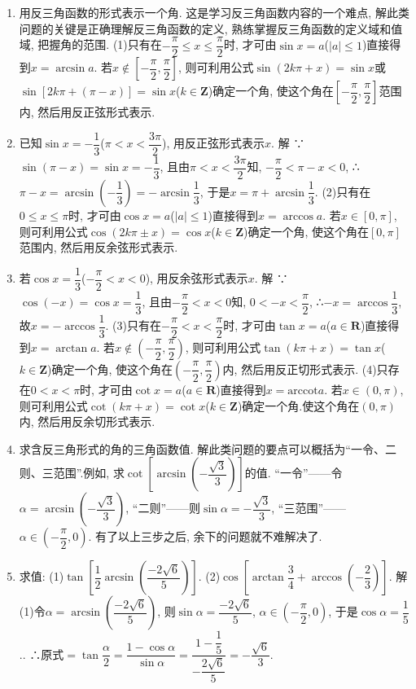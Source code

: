 \documentclass[10pt,a4paper]{article}
\begin{document}
\begin{enumerate}[1.]

\item 用反三角函数的形式表示一个角.
这是学习反三角函数内容的一个难点, 解此类问题的关键是正确理解反三角函数的定义, 熟练掌握反三角函数的定义域和值域, 把握角的范围.
(1)只有在$-\dfrac{\pi }2\le x\le \dfrac{\pi }2$时, 才可由$\sin x=a$($|a|\le 1$)直接得到$x=\arcsin a$.
若$x\notin [-\dfrac{\pi }2,\dfrac{\pi }2]$, 则可利用公式$\sin (2k\pi +x)=\sin x$或$\sin [2k\pi +(\pi -x)]=\sin x$($k\in \mathbf{Z}$)确定一个角, 使这个角在$[-\dfrac{\pi }2,\dfrac{\pi }2]$范围内, 然后用反正弦形式表示.
\item 已知$\sin x=-\dfrac 13$($\pi <x<\dfrac{3\pi }2$), 用反正弦形式表示$x$.
解  ∵$\sin (\pi -x)=\sin x=-\dfrac 13$, 且由$\pi <x<\dfrac{3\pi }2$知, $-\dfrac{\pi }2<\pi -x<0$,
∴$\pi -x=\arcsin (-\dfrac 13)=-\arcsin \dfrac 13$, 于是$x=\pi +\arcsin \dfrac 13$.
(2)只有在$0\le x\le \pi$时, 才可由$\cos x=a$($|a|\le 1$)直接得到$x=\arccos a$.
若$x\in [0,\pi]$, 则可利用公式$\cos (2k\pi \pm x)=\cos x$($k\in \mathbf{Z}$)确定一个角, 使这个角在$[0,\pi]$范围内, 然后用反余弦形式表示.
\item 若$\cos x=\dfrac 13$($-\dfrac{\pi }2<x<0$), 用反余弦形式表示$x$.
解  ∵$\cos (-x)=\cos x=\dfrac 13$, 且由$-\dfrac{\pi }2<x<0$知, $0<-x<\dfrac{\pi }2$,
∴$-x=\arccos \dfrac 13$, 故$x=-\arccos \dfrac 13$.
(3)只有在$-\dfrac{\pi }2<x<\dfrac{\pi }2$时, 才可由$\tan x=a$($a\in \mathbf{R}$)直接得到$x=\arctan a$.
若$x\notin (-\dfrac{\pi }2,\dfrac{\pi }2)$, 则可利用公式$\tan (k\pi +x)=\tan x$($k\in \mathbf{Z}$)确定一个角, 使这个角在$(-\dfrac{\pi }2,\dfrac{\pi }2)$内, 然后用反正切形式表示.
(4)只存在$0<x<\pi$时, 才可由$\cot x=a$($a\in \mathbf{R}$)直接得到$x=\mathrm{arccot} a$.
若$x\in (0,\pi)$, 则可利用公式$\cot (k\pi +x)=\cot x$($k\in \mathbf{Z}$)确定一个角.使这个角在$(0,\pi)$内, 然后用反余切形式表示.
\item 求含反三角形式的角的三角函数值.
解此类问题的要点可以概括为``一令、二则、三范围''.例如, 求$\cot [\arcsin (-\dfrac{\sqrt 3}3)]$的值.
``一令''——令$\alpha =\arcsin (-\dfrac{\sqrt 3}3)$, ``二则''——则$\sin \alpha =-\dfrac{\sqrt 3}3$, ``三范围''——$\alpha \in (-\dfrac{\pi }2,0)$.
有了以上三步之后, 余下的问题就不难解决了.
\item 求值:
(1)$\tan [\dfrac 12\arcsin (\dfrac{-2\sqrt 6}5)]$.			(2)$\cos [\arctan \dfrac 34+\arccos (-\dfrac 23)]$.
解  (1)令$\alpha =\arcsin (\dfrac{-2\sqrt 6}5)$, 则$\sin \alpha =\dfrac{-2\sqrt 6}5$, $\alpha \in (-\dfrac{\pi }2,0)$, 于是$\cos \alpha =\dfrac 15$..
∴原式$=\tan \dfrac\alpha 2=\dfrac{1-\cos \alpha }{\sin \alpha }=\dfrac{1-\dfrac 15}{-\dfrac {2\sqrt 6}5}=-\dfrac{\sqrt 6}3$.

\end{enumerate}
\end{document}
